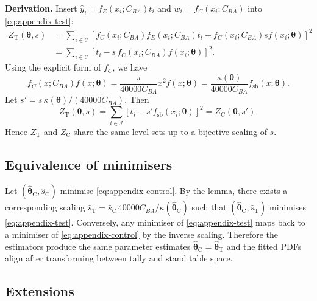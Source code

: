 \documentclass[12pt,letterpaper,leqno]{article}
\theoremstyle{plain}
\begin{document}
\noindent\textbf{Derivation.}
Insert $\hat{y}_i = f_E(x_i; C_{BA}) t_i$ and $w_i = f_C(x_i; C_{BA})$ into
\eqref{eq:appendix-test}:
\begin{align}
  Z_{\mathrm{T}}(\boldsymbol{\theta}, s)
    &= \sum_{i \in \mathcal{I}} \left[f_C(x_i; C_{BA}) f_E(x_i; C_{BA}) t_i
      - f_C(x_i; C_{BA}) s f(x_i; \boldsymbol{\theta})\right]^2 \\
    &= \sum_{i \in \mathcal{I}} \left[t_i - s \, f_C(x_i; C_{BA}) f(x_i; \boldsymbol{\theta})\right]^2.
\end{align}
Using the explicit form of $f_C$, we have
\begin{equation}
  f_C(x; C_{BA}) f(x; \boldsymbol{\theta})
  =
  \frac{\pi}{40000 C_{BA}} x^{2} f(x;\boldsymbol{\theta})
  =
  \frac{\kappa(\boldsymbol{\theta})}{40000 C_{BA}} f_{\mathrm{sb}}(x; \boldsymbol{\theta}).
\end{equation}
Let $s' = s\, \kappa(\boldsymbol{\theta})/(40000 C_{BA})$. Then
\begin{equation}
  Z_{\mathrm{T}}(\boldsymbol{\theta}, s)
  =
  \sum_{i \in \mathcal{I}} \left[t_i - s' f_{\mathrm{sb}}(x_i; \boldsymbol{\theta})\right]^2
  =
  Z_{\mathrm{C}}(\boldsymbol{\theta}, s').
\end{equation}
Hence $Z_{\mathrm{T}}$ and $Z_{\mathrm{C}}$ share the same level sets up to a
bijective scaling of $s$.

\subsection*{Equivalence of minimisers}

Let $(\hat{\boldsymbol{\theta}}_{\mathrm{C}}, \hat{s}_{\mathrm{C}})$ minimise
\eqref{eq:appendix-control}. By the lemma, there exists a corresponding scaling
$\hat{s}_{\mathrm{T}} = \hat{s}_{\mathrm{C}}\, 40000 C_{BA}/\kappa(\hat{\boldsymbol{\theta}}_{\mathrm{C}})$
such that $(\hat{\boldsymbol{\theta}}_{\mathrm{C}}, \hat{s}_{\mathrm{T}})$ minimises
\eqref{eq:appendix-test}. Conversely, any minimiser of
\eqref{eq:appendix-test} maps back to a minimiser of \eqref{eq:appendix-control}
by the inverse scaling. Therefore the estimators produce the same parameter
estimates $\hat{\boldsymbol{\theta}}_{\mathrm{C}} = \hat{\boldsymbol{\theta}}_{\mathrm{T}}$ and
the fitted PDFs align after transforming between tally and stand table space.

\subsection*{Extensions}
\end{document}

